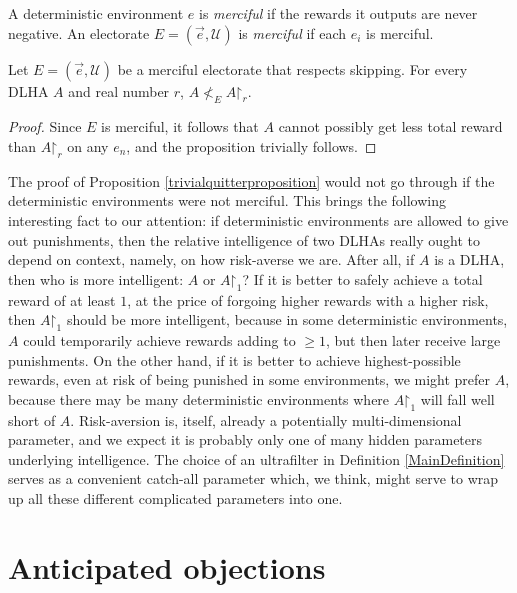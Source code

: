 \documentclass[twoside,11pt]{article}
\begin{document}
\begin{definition}
    A deterministic environment $e$ is \emph{merciful} if
    the rewards it outputs are never negative.
    An electorate $E=(\vec{e},\mathscr U)$ is \emph{merciful}
    if each $e_i$ is merciful.
\end{definition}

\begin{proposition}
\label{trivialquitterproposition}
    Let $E=(\vec{e},\mathscr U)$ be a merciful electorate that respects skipping.
    For every DLHA $A$ and real number $r$, $A\not<_{E}A\mathord{\restriction}_r$.
\end{proposition}

\begin{proof}
    Since $E$ is merciful,
    it follows that $A$ cannot possibly get less total reward than $A\mathord{\restriction}_r$
    on any $e_n$, and the proposition trivially follows.
\end{proof}

The proof of Proposition \ref{trivialquitterproposition} would not go through if
the deterministic environments were not merciful.
This brings the following interesting fact to our attention:
if deterministic environments are allowed to give out punishments,
then the relative intelligence of two DLHAs really ought to depend on
context, namely, on how risk-averse we are.
After all, if $A$ is a DLHA, then who
is more intelligent: $A$ or $A\mathord{\restriction}_1$?
If it is better to safely achieve a total reward of at
least $1$, at the price of forgoing higher rewards with a higher risk,
then $A\mathord{\restriction}_1$
should be more intelligent, because in some deterministic environments,
$A$ could temporarily achieve rewards adding to $\geq 1$, but then later
receive large punishments. On the other hand, if
it is better to achieve highest-possible rewards, even at risk of being punished
in some environments, we might prefer $A$, because there may be many deterministic environments
where $A\mathord{\restriction}_1$ will fall well short of $A$.
Risk-aversion is, itself, already a potentially multi-dimensional parameter, and we
expect it is probably only one of many hidden parameters
underlying intelligence. The choice of an ultrafilter in Definition \ref{MainDefinition}
serves as a convenient catch-all parameter which, we think, might serve to wrap up all
these different complicated parameters into one.


\section{Anticipated objections}
\label{objectionsection}
\end{document}
